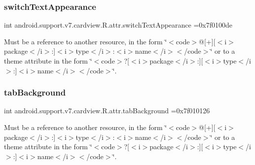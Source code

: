 \subsubsection{\texorpdfstring{switch\+Text\+Appearance}{switchTextAppearance}}
{\footnotesize\ttfamily int android.\+support.\+v7.\+cardview.\+R.\+attr.\+switch\+Text\+Appearance =0x7f0100de\hspace{0.3cm}{\ttfamily [static]}}

Must be a reference to another resource, in the form \char`\"{}$<$code$>$@\mbox{[}+\mbox{]}\mbox{[}$<$i$>$package$<$/i$>$\+:\mbox{]}$<$i$>$type$<$/i$>$\+:$<$i$>$name$<$/i$>$$<$/code$>$\char`\"{} or to a theme attribute in the form \char`\"{}$<$code$>$?\mbox{[}$<$i$>$package$<$/i$>$\+:\mbox{]}\mbox{[}$<$i$>$type$<$/i$>$\+:\mbox{]}$<$i$>$name$<$/i$>$$<$/code$>$\char`\"{}. \mbox{\label{classandroid_1_1support_1_1v7_1_1cardview_1_1R_1_1attr_afbb4b95c4751cc3b349627d941ac9d92}} 
\subsubsection{\texorpdfstring{tab\+Background}{tabBackground}}
{\footnotesize\ttfamily int android.\+support.\+v7.\+cardview.\+R.\+attr.\+tab\+Background =0x7f010126\hspace{0.3cm}{\ttfamily [static]}}

Must be a reference to another resource, in the form \char`\"{}$<$code$>$@\mbox{[}+\mbox{]}\mbox{[}$<$i$>$package$<$/i$>$\+:\mbox{]}$<$i$>$type$<$/i$>$\+:$<$i$>$name$<$/i$>$$<$/code$>$\char`\"{} or to a theme attribute in the form \char`\"{}$<$code$>$?\mbox{[}$<$i$>$package$<$/i$>$\+:\mbox{]}\mbox{[}$<$i$>$type$<$/i$>$\+:\mbox{]}$<$i$>$name$<$/i$>$$<$/code$>$\char`\"{}. \mbox{\label{classandroid_1_1support_1_1v7_1_1cardview_1_1R_1_1attr_aabbbb2a5e66b6f302100163d05d7e57f}} 

